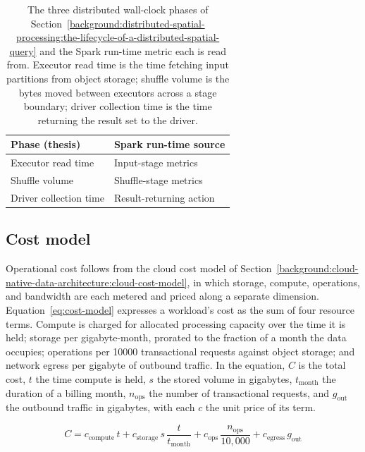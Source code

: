 \begin{table}[H]
	\centering
	\caption[Distributed phase metrics and their Spark run-time sources]{The three distributed wall-clock phases of Section~\ref{background:distributed-spatial-processing:the-lifecycle-of-a-distributed-spatial-query} and the Spark run-time metric each is read from. Executor read time is the time fetching input partitions from object storage; shuffle volume is the bytes moved between executors across a stage boundary; driver collection time is the time returning the result set to the driver.}
	\label{tab:distributed-phase-metrics}
	\begin{tabular}{@{}ll@{}}
		\toprule
		Phase (thesis) & Spark run-time source \\
		\midrule
		Executor read time & Input-stage metrics \\
		Shuffle volume & Shuffle-stage metrics \\
		Driver collection time & Result-returning action \\
		\bottomrule
	\end{tabular}
\end{table}

\subsection{Cost model}
\label{research-design-and-methodology:metrics-and-cost-model:cost-model}

Operational cost follows from the cloud cost model of Section~\ref{background:cloud-native-data-architecture:cloud-cost-model}, in which storage, compute, operations, and bandwidth are each metered and priced along a separate dimension. Equation~\ref{eq:cost-model} expresses a workload's cost as the sum of four resource terms. Compute is charged for allocated processing capacity over the time it is held; storage per gigabyte-month, prorated to the fraction of a month the data occupies; operations per \num{10000} transactional requests against object storage; and network egress per gigabyte of outbound traffic. In the equation, $C$ is the total cost, $t$ the time compute is held, $s$ the stored volume in gigabytes, $t_{\text{month}}$ the duration of a billing month, $n_{\text{ops}}$ the number of transactional requests, and $g_{\text{out}}$ the outbound traffic in gigabytes, with each $c$ the unit price of its term.

\begin{equation}
	C = c_{\text{compute}}\, t + c_{\text{storage}}\, s \, \frac{t}{t_{\text{month}}} + c_{\text{ops}}\, \frac{n_{\text{ops}}}{10{,}000} + c_{\text{egress}}\, g_{\text{out}}
	\label{eq:cost-model}
\end{equation}

